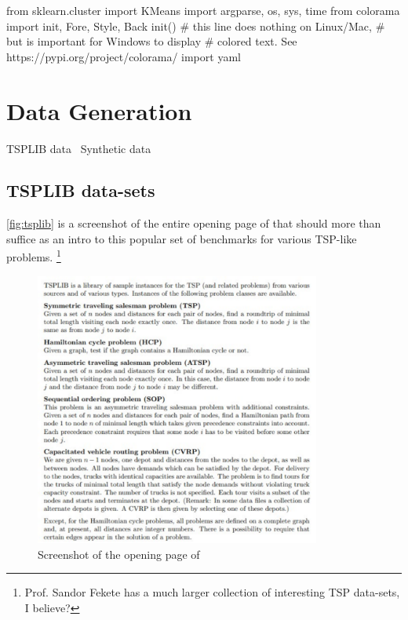 from sklearn.cluster import KMeans
import argparse, os, sys, time
from colorama import init, Fore, Style, Back
init() # this line does nothing on Linux/Mac,
       # but is important for Windows to display
       # colored text. See https://pypi.org/project/colorama/
import yaml
\nwendcode{}\nwdocspar


\section{Data Generation}

\nwenddocs{}\endmoddef\nwstartdeflinemarkup{}\nwenddeflinemarkup
\LA{}TSPLIB data~{\nwtagstyle{}}\RA{}
\LA{}Synthetic data~{\nwtagstyle{}}\RA{}
\nwendcode{}\nwdocspar

\subsection{TSPLIB data-sets}

\autoref{fig:tsplib} is a screenshot of the entire opening page of \cite{reinelt1991tsplib}
that should more than suffice as an intro to this popular set of benchmarks for various TSP-like problems. \footnote{Prof. Sandor Fekete has a much larger collection of interesting TSP data-sets, I believe?}

\begin{figure}[htbp]
  \centering
  \includegraphics[width=9.4cm]{miscimages/tsplib-screenshot.pdf}
  \caption{\label{fig:tsplib} Screenshot of the opening page of \cite{reinelt1991tsplib} }
\end{figure}

